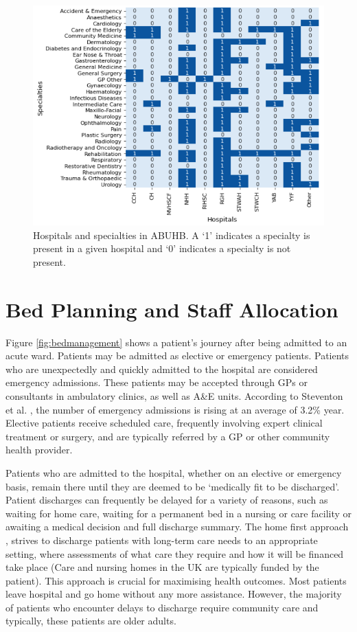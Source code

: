 \documentclass[../thesis.tex]{subfiles}
\begin{document}
\begin{figure}[h!]
    \centering
    \includegraphics[scale=0.9]{Chapters/Chapter1/Figures/Hospitalloc19.png}
    \caption{Hospitals and specialties in ABUHB. A `1' indicates a specialty is present in a given hospital and `0' indicates a specialty is not present.}
    \label{fig:hospspec}
\end{figure}

\section{Bed Planning and Staff Allocation}
Figure \ref{fig:bedmanagement} shows a patient's journey after being admitted to an acute ward. Patients may be admitted as elective or emergency patients. Patients who are unexpectedly and quickly admitted to the hospital are considered emergency admissions. These patients may be accepted through GPs or consultants in ambulatory clinics, as well as A\&E units. According to Steventon et al. \cite{Steventon2018}, the number of emergency admissions is rising at an average of 3.2\% year. Elective patients receive scheduled care, frequently involving expert clinical treatment or surgery, and are typically referred by a GP or other community health provider.

Patients who are admitted to the hospital, whether on an elective or emergency basis, remain there until they are deemed to be `medically fit to be discharged'. Patient discharges can frequently be delayed for a variety of reasons, such as waiting for home care, waiting for a permanent bed in a nursing or care facility or awaiting a medical decision and full discharge summary. The home first approach \cite{NHSEnglandb}, strives to discharge patients with long-term care needs to an appropriate setting, where assessments of what care they require and how it will be financed take place (Care and nursing homes in the UK are typically funded by the patient). This approach is crucial for maximising health outcomes. Most patients leave hospital and go home without any more assistance. However, the majority of patients who encounter delays to discharge require community care and typically, these patients are older adults.
\end{document}
